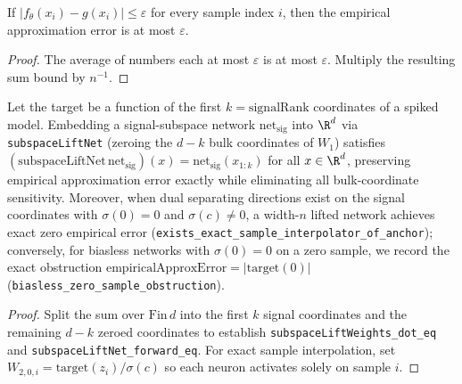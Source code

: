 \begin{lemma}\label{lem:approx_error_pointwise}
\leanok
{}
If $|f_\theta(x_i)-g(x_i)|\le\varepsilon$ for every sample index $i$, then the empirical approximation error is at most $\varepsilon$.
\end{lemma}
\begin{proof}
\leanok
The average of numbers each at most $\varepsilon$ is at most $\varepsilon$. Multiply the resulting sum bound by $n^{-1}$.
\end{proof}

\begin{lemma}\label{lem:expressivity_subspace}
\leanok
{}
Let the target be a function of the first $k = \mathrm{signalRank}$ coordinates of a spiked model. Embedding a signal-subspace network $\mathrm{net}_{\mathrm{sig}}$ into $\R^d$ via \texttt{subspaceLiftNet} (zeroing the $d-k$ bulk coordinates of $W_1$) satisfies $(\mathrm{subspaceLiftNet}\,\mathrm{net}_{\mathrm{sig}})(x) = \mathrm{net}_{\mathrm{sig}}(x_{1:k})$ for all $x\in\R^d$, preserving empirical approximation error exactly while eliminating all bulk-coordinate sensitivity. Moreover, when dual separating directions exist on the signal coordinates with $\sigma(0)=0$ and $\sigma(c)\ne 0$, a width-$n$ lifted network achieves exact zero empirical error (\texttt{exists\_exact\_sample\_interpolator\_of\_anchor}); conversely, for biasless networks with $\sigma(0)=0$ on a zero sample, we record the exact obstruction $\mathrm{empiricalApproxError} = |\mathrm{target}(0)|$ (\texttt{biasless\_zero\_sample\_obstruction}).
\end{lemma}
\begin{proof}
\leanok
Split the sum over $\mathrm{Fin}\,d$ into the first $k$ signal coordinates and the remaining $d-k$ zeroed coordinates to establish \texttt{subspaceLiftWeights\_dot\_eq} and \texttt{subspaceLiftNet\_forward\_eq}. For exact sample interpolation, set $W_{2,0,i} = \mathrm{target}(z_i)/\sigma(c)$ so each neuron activates solely on sample $i$.
\end{proof}

